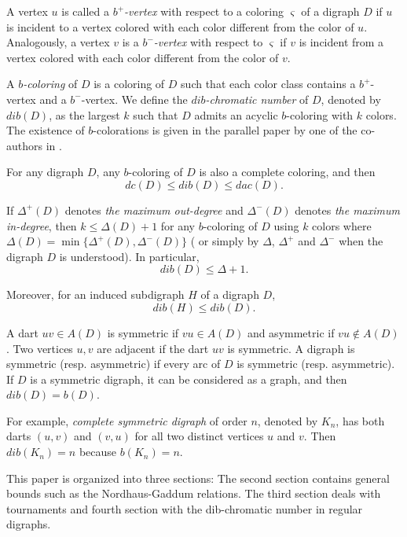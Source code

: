 \documentclass[12pt]{article}
\begin{document}
A vertex $u$ is called a \emph{$b^+$-vertex} with respect to a coloring $\varsigma$ of a digraph $D$ if $u$ is incident to a vertex colored with each color different from the color of $u$. Analogously, a vertex $v$ is a \emph{$b^-$-vertex} with respect to $\varsigma$ if $v$ is incident from a vertex colored with each color different from the color of $v$.

A \emph{$b$-coloring} of $D$ is a coloring of $D$ such that each color class contains a $b^+$-vertex and a $b^-$-vertex.
We define the \emph{$dib$-chromatic number} of $D$, denoted by $dib(D)$, as the largest $k$ such that $D$ admits an acyclic $b$-coloring with $k$ colors. The existence of $b$-colorations is given in the parallel paper by one of the co-authors in \cite{montellano2025dib}.

For any digraph $D$, any $b$-coloring of $D$ is also a complete coloring, and then
\begin{equation}\label{eq1}
    dc(D)\leq dib(D)\leq dac(D).
\end{equation}

If $\Delta^+(D)$ denotes \emph{the maximum out-degree} and $\Delta^-(D)$ denotes \emph{the maximum in-degree}, then $k \leq \Delta(D)+1$ for any $b$-coloring of $D$ using $k$ colors where $\Delta(D)=\min\{\Delta^+(D),\Delta^-(D)\}$ ( or simply by $\Delta$, $\Delta^+$ and $\Delta^-$  when the digraph $D$ is understood). In particular, 
\begin{equation}\label{eq2}
    dib(D) \leq \Delta+1.
\end{equation}

Moreover, for an induced subdigraph $H$ of a digraph $D$,
\begin{equation}\label{eq3}
    dib(H) \leq dib(D).
\end{equation}

A dart $uv\in A(D)$ is symmetric if $vu\in A(D)$ and asymmetric if $vu\notin A(D)$. Two vertices $u,v$ are adjacent if the dart $uv$ is symmetric. A digraph is symmetric (resp. asymmetric) if every arc of $D$ is symmetric (resp. asymmetric). If $D$ is a symmetric digraph, it can be considered as a graph, and then $dib(D)=b(D)$.

For example, \emph{complete symmetric digraph} of order $n$, denoted by $K_n$, has both darts $(u,v)$ and $(v,u)$ for all two distinct vertices $u$ and $v$.
Then $dib(K_n)=n$ because $b(K_n)=n$.

This paper is organized into three sections: The second section contains general bounds such as the Nordhaus-Gaddum relations. The third section deals with tournaments and fourth section with the dib-chromatic number in regular digraphs. %
\end{document}
